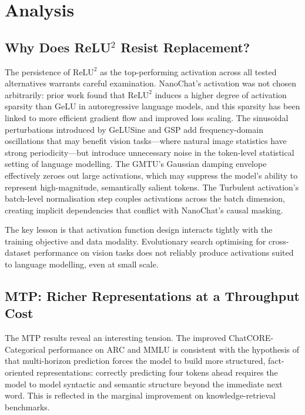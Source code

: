 \section{Analysis}

\subsection{Why Does ReLU\texorpdfstring{$^2$}{2} Resist Replacement?}

The persistence of $\mathrm{ReLU}^2$ as the top-performing activation across all tested
alternatives warrants careful examination.
NanoChat's activation was not chosen arbitrarily: prior work \parencite{so2021primer} found that
$\mathrm{ReLU}^2$ induces a higher degree of activation sparsity than GeLU in autoregressive
language models, and this sparsity has been linked to more efficient gradient flow and improved
loss scaling.
The sinusoidal perturbations introduced by GeLUSine and GSP add frequency-domain oscillations
that may benefit vision tasks---where natural image statistics have strong periodicity---but
introduce unnecessary noise in the token-level statistical setting of language modelling.
The GMTU's Gaussian damping envelope effectively zeroes out large activations, which may suppress
the model's ability to represent high-magnitude, semantically salient tokens.
The Turbulent activation's batch-level normalisation step couples activations across the batch
dimension, creating implicit dependencies that conflict with NanoChat's causal masking.

The key lesson is that activation function design interacts tightly with the training objective
and data modality.
Evolutionary search optimising for cross-dataset performance on vision tasks does not reliably
produce activations suited to language modelling, even at small scale.

\subsection{MTP: Richer Representations at a Throughput Cost}

The MTP results reveal an interesting tension.
The improved ChatCORE-Categorical performance on ARC and MMLU is consistent with the hypothesis
of \textcite{gloeckle2024better} that multi-horizon prediction forces the model to build more
structured, fact-oriented representations: correctly predicting four tokens ahead requires the
model to model syntactic and semantic structure beyond the immediate next word.
This is reflected in the marginal improvement on knowledge-retrieval benchmarks.

